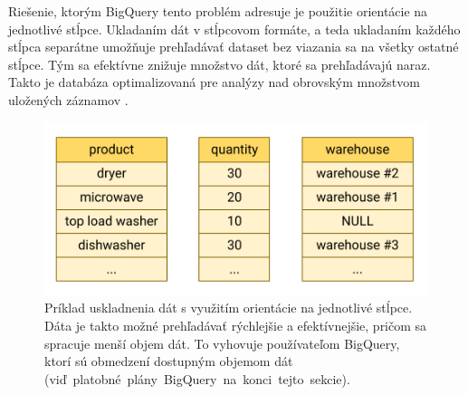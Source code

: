 Riešenie, ktorým BigQuery tento problém adresuje je použitie orientácie na jednotlivé stĺpce. 
Ukladaním dát v stĺpcovom formáte, a teda ukladaním každého stĺpca separátne umožňuje prehľadávať dataset bez viazania sa na všetky ostatné stĺpce.
Tým sa efektívne znižuje množstvo dát, ktoré sa prehľadávajú naraz.
Takto je databáza optimalizovaná pre analýzy nad obrovským množstvom uložených záznamov \cite{google-bq}.

\begin{figure}[htb]
\begin{center}
 \includegraphics[scale=0.7]{obrazky-figures/column-oriented-store.png}
 \caption{\centering Príklad uskladnenia dát s využitím orientácie na jednotlivé stĺpce. Dáta je takto možné prehľadávať rýchlejšie a efektívnejšie, pričom sa spracuje menší objem dát. To vyhovuje používateľom BigQuery, ktorí sú obmedzení dostupným objemom dát \mbox{(viď platobné plány BigQuery na konci tejto sekcie).}}
 \label{img:column-oriented-store}
\end{center}
\end{figure}

